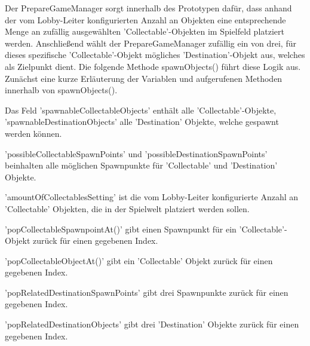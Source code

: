 Der PrepareGameManager sorgt innerhalb des Prototypen dafür, dass anhand der vom Lobby-Leiter konfigurierten Anzahl an Objekten eine entsprechende Menge an zufällig ausgewählten 'Collectable'-Objekten im Spielfeld platziert werden. Anschließend wählt der PrepareGameManager zufällig ein von drei, für dieses spezifische 'Collectable'-Objekt mögliches 'Destination'-Objekt aus, welches als Zielpunkt dient. Die folgende Methode spawnObjects() führt diese Logik aus. Zunächst eine kurze Erläuterung der Variablen und aufgerufenen Methoden innerhalb von spawnObjects().

Das Feld 'spawnableCollectableObjects' enthält alle 'Collectable'-Objekte, 'spawnableDestinationObjects' alle 'Destination' Objekte, welche gespawnt werden können.

'possibleCollectableSpawnPoints' und 'possibleDestinationSpawnPoints' beinhalten alle möglichen Spawnpunkte für 'Collectable' und 'Destination' Objekte.

'amountOfCollectablesSetting' ist die vom Lobby-Leiter konfigurierte Anzahl an 'Collectable' Objekten, die in der Spielwelt platziert werden sollen.

'popCollectableSpawnpointAt()' gibt einen Spawnpunkt für ein 'Collectable'-Objekt zurück für einen gegebenen Index.

'popCollectableObjectAt()' gibt ein 'Collectable' Objekt zurück für einen gegebenen Index.

'popRelatedDestinationSpawnPoints' gibt drei Spawnpunkte zurück für einen gegebenen Index.

'popRelatedDestinationObjects' gibt drei 'Destination' Objekte zurück für einen gegebenen Index.


